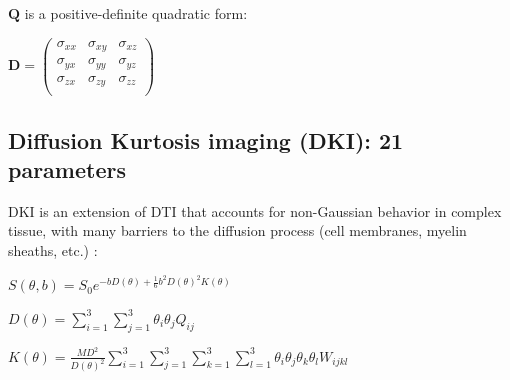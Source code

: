\documentclass[a0, landscape]{a0poster}
\begin{document}
\begin{multicols}{3}
\noindent $\mathbf{Q}$ is a positive-definite quadratic form:

\vspace{2mm}
\begin{center}

$\mathbf{D} = \begin{pmatrix} \sigma_{xx} & \sigma_{xy} & \sigma_{xz} \\
                              \sigma_{yx} & \sigma_{yy} & \sigma_{yz} \\
				                      \sigma_{zx} & \sigma_{zy} & \sigma_{zz} \\
\end{pmatrix} $

\end{center}

\subsection*{Diffusion Kurtosis imaging (DKI): 21 parameters}

DKI is an extension of DTI that accounts for non-Gaussian behavior in complex tissue, with many barriers to the diffusion process (cell membranes,
myelin sheaths, etc.) \cite{Jensen2005-vr}:

\vspace{2mm}
\begin{center}
\begin{large}

$ S(\theta, b)=S_{0}e^{-bD(\theta)+\frac{1}{6}b^{2}D(\theta)^{2}K(\theta)}$

\vspace{2mm}
\end{large}
\end{center}

\vspace{2mm}
\begin{center}
\begin{large}

$D(\theta)=\sum_{i=1}^{3}\sum_{j=1}^{3}\theta_{i}\theta_{j}Q_{ij}$

\vspace{2mm}
\end{large}
\end{center}

\vspace{2mm}
\begin{center}
\begin{large}

$K(\theta)=\frac{MD^{2}}{D(\theta)^{2}}\sum_{i=1}^{3}\sum_{j=1}^{3}\sum_{k=1}^{3} \sum_{l=1}^{3}\theta_{i}\theta_{j}\theta_{k}\theta_{l}W_{ijkl}$


\end{large}
\end{center}
\end{multicols}
\end{document}
